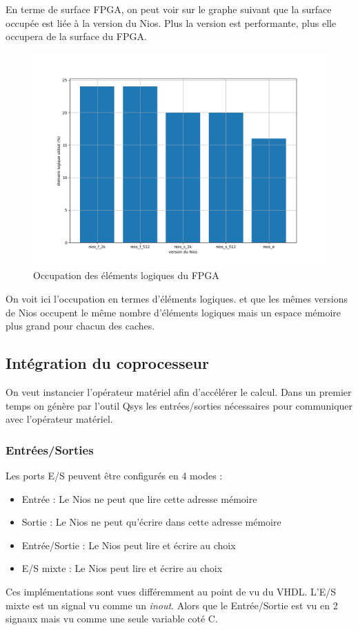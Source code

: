 \documentclass[12pt,a4paper]{article}
\begin{document}
En terme de surface FPGA, on peut voir sur le graphe suivant que la surface occupée est liée à la version du Nios. Plus la version est performante, plus elle occupera de la surface du FPGA.
\begin{figure}[H]
	\centering
	\includegraphics[width=0.8\linewidth]{figures/plot}
	\caption{Occupation des éléments logiques du FPGA}
\end{figure}
On voit ici l'occupation en termes d'éléments logiques. et que les mêmes versions de Nios occupent le même nombre d'éléments logiques mais un espace mémoire plus grand pour chacun des caches.

\subsection{Intégration du coprocesseur}
On veut instancier l'opérateur matériel afin d'accélérer le calcul. Dans un premier temps on génère par l'outil Qsys les entrées/sorties nécessaires pour communiquer avec l'opérateur matériel.

\subsubsection{Entrées/Sorties}
Les ports E/S peuvent être configurés en 4 modes : 
\begin{itemize}
	\item Entrée : Le Nios ne peut que lire cette adresse mémoire
	\item Sortie : Le Nios ne peut qu'écrire dans cette adresse mémoire
	\item Entrée/Sortie : Le Nios peut lire et écrire au choix
	\item E/S mixte : Le Nios peut lire et écrire au choix
\end{itemize}
Ces implémentations sont vues différemment au point de vu du VHDL. L'E/S mixte est un signal vu comme un \textit{inout}. Alors que le Entrée/Sortie
est vu en 2 signaux mais vu comme une seule variable coté C.
\end{document}

